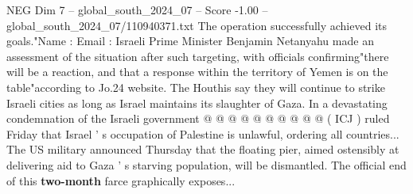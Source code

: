 \begin{textsample}{NEG Dim 7 – global\_south\_2024\_07 – Score -1.00 – global\_south\_2024\_07/110940371.txt}
The operation successfully achieved its goals."Name : Email : Israeli Prime Minister Benjamin Netanyahu made an assessment of the situation after such targeting, with officials confirming"there will be a reaction, and that a response within the territory of Yemen is on the table"according to Jo.24 website.
The Houthis say they will continue to strike Israeli cities as long as Israel maintains its slaughter of Gaza.
In a devastating condemnation of the Israeli government @ @ @ @ @ @ @ @ @ @ ( ICJ ) ruled Friday that Israel ' s occupation of Palestine is unlawful, ordering all countries...
The US military announced Thursday that the floating pier, aimed ostensibly at delivering aid to Gaza ' s starving population, will be dismantled.
The official end of this \textbf{two-month} farce graphically exposes...

\end{textsample}
